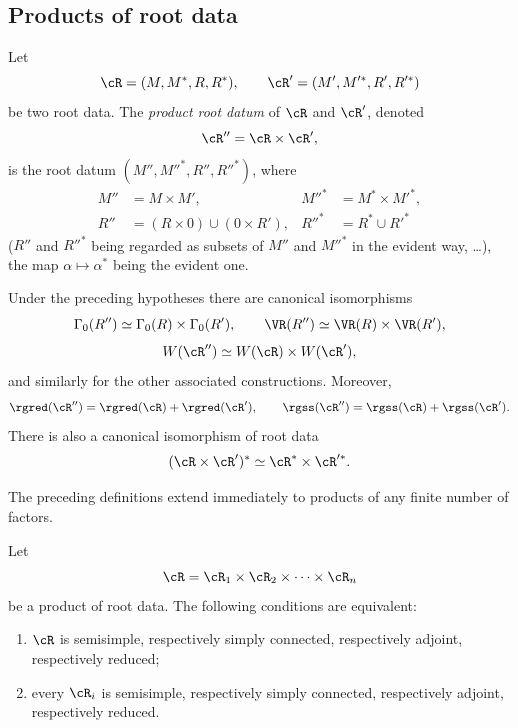 \subsection{Products of root data}\label{sga3:XXI:6.4}

\begin{definition}\label{sga3:XXI:6.4.1}
Let
\[
 \cR=(M,M^\ast,R,R^\ast),
 \qquad
 \cR'=(M',M'^\ast,R',R'^\ast)
\]
be two root data. The \emph{product root datum} of \(\cR\) and
\(\cR'\), denoted
\[
 \cR''=\cR\times\cR',
\]
is the root datum \((M'',M''^\ast,R'',R''^\ast)\), where
\[
\begin{aligned}
 M''&=M\times M',
 &M''^\ast&=M^\ast\times M'^\ast,\\
 R''&=(R\times0)\cup(0\times R'),
 &R''^\ast&=R^\ast\cup R'^\ast
\end{aligned}
\]
(\(R''\) and \(R''^\ast\) being regarded as subsets of \(M''\) and
\(M''^\ast\) in the evident way, \ldots), the map
\(\alpha\mapsto\alpha^\ast\) being the evident one.
\end{definition}

\begin{proposition}\label{sga3:XXI:6.4.2}
Under the preceding hypotheses there are canonical isomorphisms
\[
 \Gamma_0(R'')\simeq\Gamma_0(R)\times\Gamma_0(R'),
 \qquad
 \VR(R'')\simeq\VR(R)\times\VR(R'),
\]
\[
 W(\cR'')\simeq W(\cR)\times W(\cR'),
\]
and similarly for the other associated constructions. Moreover,
\[
 \rgred(\cR'')=\rgred(\cR)+\rgred(\cR'),
 \qquad
 \rgss(\cR'')=\rgss(\cR)+\rgss(\cR').
\]
There is also a canonical isomorphism of root data
\[
 (\cR\times\cR')^\ast\simeq\cR^\ast\times\cR'^\ast.
\]
\end{proposition}

The preceding definitions extend immediately to products of any finite
number of factors.

\begin{proposition}\label{sga3:XXI:6.4.3}
Let
\[
 \cR=\cR_1\times\cR_2\times\cdots\times\cR_n
\]
be a product of root data. The following conditions are equivalent:
\begin{enumerate}
\item[(i)] \(\cR\) is semisimple, respectively simply connected,
  respectively adjoint, respectively reduced;
\item[(ii)] every \(\cR_i\) is semisimple, respectively simply
  connected, respectively adjoint, respectively reduced.
\end{enumerate}
\end{proposition}

